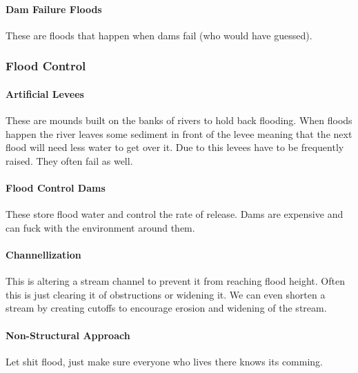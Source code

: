 \documentclass{article}
\begin{document}
\paragraph{Dam Failure Floods} %
\label{par:dam_failure_floods}
These are floods that happen when dams fail (who would have guessed).
\subsubsection{Flood Control} %
\label{ssub:flood_control}
\paragraph{Artificial Levees} %
\label{par:artificial_levees}
These are mounds built on the banks of rivers to hold back flooding. When floods happen the river leaves some sediment in front of the levee meaning that the next flood will need less water to get over it. Due to this levees have to be frequently raised. They often fail as well.
\paragraph{Flood Control Dams} %
\label{par:flood_control_dams}
These store flood water and control the rate of release. Dams are expensive and can fuck with the environment around them.
\paragraph{Channellization} %
\label{par:channellization}
This is altering a stream channel to prevent it from reaching flood height. Often this is just clearing it of obstructions or widening it. We can even shorten a stream by creating cutoffs to encourage erosion and widening of the stream.
\paragraph{Non-Structural Approach} %
\label{par:non_structural_approach}
Let shit flood, just make sure everyone who lives there knows its comming.










\end{document}
